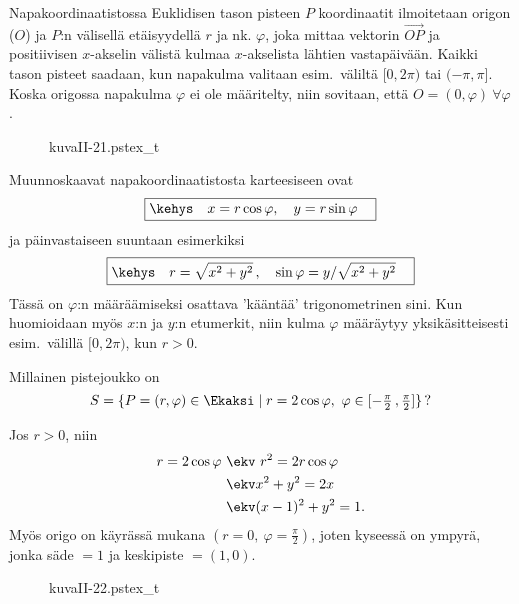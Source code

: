 Napakoordinaatistossa Euklidisen tason pisteen $P$ koordinaatit ilmoitetaan origon ($O$) ja 
$P$:n välisellä etäisyydellä $r$ ja nk.  $\varphi$, joka mittaa vektorin 
$\overrightarrow{OP}$ ja positiivisen $x$-akselin välistä kulmaa $x$-akselista lähtien 
vastapäivään. Kaikki tason pisteet saadaan, kun napakulma valitaan esim.\ väliltä $[0,2\pi)$ tai
$(-\pi,\pi]$. Koska origossa napakulma $\varphi$ ei ole määritelty, niin sovitaan, että
$O=(0,\varphi)\ \forall\varphi$.
\begin{figure}[H]
\begin{center}
{kuvaII-21.pstex_t}
\end{center}
\end{figure}
Muunnoskaavat napakoordinaatistosta karteesiseen ovat
\[
\boxed{\kehys\quad x=r\cos{\varphi}, \quad y=r\sin{\varphi} \quad}
\]
ja päinvastaiseen suuntaan esimerkiksi
\[
\boxed{\kehys\quad r=\sqrt{x^2 + y^2}\,, \quad \sin{\varphi}=y/\sqrt{x^2 + y^2} \quad}
\]
Tässä on $\varphi$:n määräämiseksi osattava 'kääntää' trigonometrinen sini. Kun huomioidaan myös
$x$:n ja $y$:n etumerkit, niin kulma $\varphi$ määräytyy yksikäsitteisesti esim.\ välillä 
$[0,2\pi)$, kun $r>0$. 
\begin{Exa}
Millainen pistejoukko on
\[
S=\{P=(r,\varphi) \in \Ekaksi \mid r=2\cos\varphi, \ 
                   \varphi\in[-\tfrac{\pi}{2}\,,\tfrac{\pi}{2}]\}\,?
\]
\end{Exa}
\ratk Jos $r > 0$, niin
\begin{align*}
r=2\cos{\varphi} \ &\ekv \ r^2=2r\cos{\varphi} \\
&\ekv x^2+y^2=2x \\
&\ekv (x-1)^2+y^2=1.
\end{align*}
Myös origo on käyrässä mukana $(r=0, \ \varphi=\frac{\pi}{2})$, joten kyseessä on ympyrä, jonka
säde $=1$ ja keskipiste $=(1,0)$. \loppu
\begin{figure}[H]
\begin{center}
{kuvaII-22.pstex_t}
\end{center}
\end{figure}

